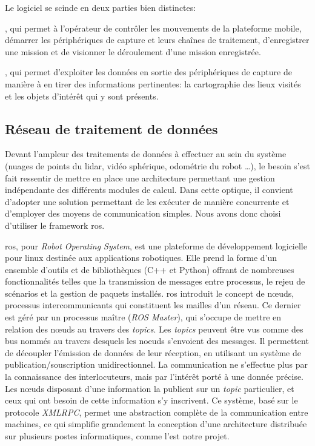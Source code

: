 			\par
			Le logiciel se scinde en deux parties bien distinctes:
			\begin{description}[noitemsep]
				\item[l'Interface Homme-Machine], qui permet à l'opérateur de contrôler les mouvements de la plateforme mobile, démarrer les périphériques de capture et leurs chaînes de traitement, d'enregistrer une mission et de visionner le déroulement d'une mission enregistrée.
				\item[le réseau de traitement de données], qui permet d'exploiter les données en sortie des périphériques de capture de manière à en tirer des informations pertinentes: la cartographie des lieux visités et les objets d'intérêt qui y sont présents.
			\end{description}

		\subsection{Réseau de traitement de données}

			Devant l'ampleur des traitements de données à effectuer au sein du système (nuages de points du \gls{lidar}, vidéo sphérique, odométrie du robot \ldots), le besoin s'est fait ressentir de mettre en place une architecture permettant une gestion indépendante des différents modules de calcul. Dans cette optique, il convient d'adopter une solution permettant de les exécuter de manière concurrente et d'employer des moyens de communication simples. Nous avons donc choisi d'utiliser le framework \gls{ros}.
			\par
			\gls{ros}, pour \emph{Robot Operating System}, est une plateforme de développement logicielle pour linux destinée aux applications robotiques. Elle prend la forme d'un ensemble d'outils et de bibliothèques (C++ et Python) offrant de nombreuses fonctionnalités telles que la transmission de messages entre processus, le rejeu de scénarios et la gestion de paquets installés. \gls{ros} introduit le concept de n\oe{}uds, processus intercommunicants qui constituent les mailles d'un réseau. Ce dernier est géré par un processus maître (\emph{ROS Master}), qui s'occupe de mettre en relation des n\oe{}uds au travers des \emph{topics}. Les \emph{topics} peuvent être vus comme des bus nommés au travers desquels les noeuds s'envoient des messages.
			Il permettent de découpler l'émission de données de leur réception, en utilisant un système de publication/souscription unidirectionnel. La communication ne s'effectue plus par la connaissance des interlocuteurs, mais par l'intérêt porté à une donnée précise.
			Les n\oe{}uds disposant d'une information la publient sur un \emph{topic} particulier, et ceux qui ont besoin de cette information s'y inscrivent. Ce système, basé sur le protocole \emph{XMLRPC}, permet une abstraction complète de la communication entre machines, ce qui simplifie grandement la conception d'une architecture distribuée sur plusieurs postes informatiques, comme l'est notre projet.
			\par
			
